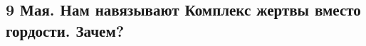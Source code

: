  
 
 
 
 

\subsection{9 Мая. Нам навязывают Комплекс жертвы вместо гордости. Зачем?}
\label{sec:09_05_2021.fb.zharkih_ekaterina.1.den_pobedy}
\Purl{https://www.facebook.com/%

9 мая. День Победы.

}
